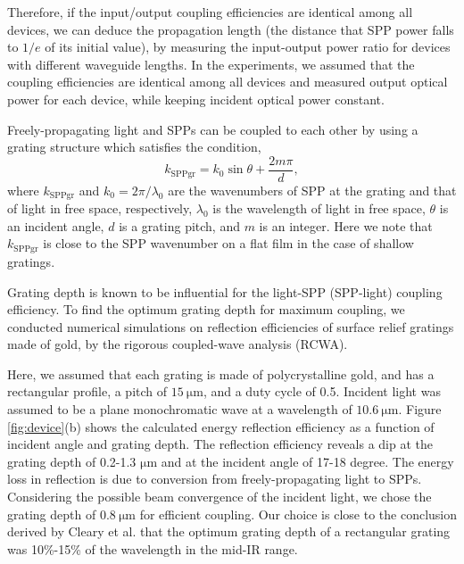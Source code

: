 \documentclass[aip,apl,reprint]{revtex4-1}
\begin{document}
Therefore, if the input/output coupling efficiencies are identical among all devices, we can deduce the propagation length (the distance that SPP power falls to $1/e$ of its initial value), by measuring the input-output power ratio for devices with different waveguide lengths.  In the experiments, we assumed that the coupling efficiencies are identical among all devices and measured output optical power for each device, while keeping incident optical power constant. 

Freely-propagating light and SPPs can be coupled to each other by using a grating structure which satisfies the condition\cite{Koev},
\begin{equation}
k_{\mathrm{SPPgr}}=k_0 \sin \theta + \frac{2m\pi}{d},
\label{eq:phase-match}
\end{equation}
where $k_{\mathrm{SPPgr}}$ and $k_0=2\pi/\lambda_0$ are the wavenumbers of SPP at the grating and that of light in free space, respectively, $\lambda_0$ is the wavelength of light in free space, $\theta$ is an incident angle, $d$ is a grating pitch, and $m$ is an integer. Here we note that $k_{\mathrm{SPPgr}}$ is close to the SPP wavenumber on a flat film in the case of shallow gratings.

Grating depth is known to be influential for the light-SPP (SPP-light) coupling efficiency\cite{Koev, Cleary2010}. To find the optimum grating \color{red}depth \color{black}for maximum coupling, we conducted numerical simulations on reflection efficiencies of surface relief gratings made of gold, by the rigorous coupled-wave analysis (RCWA)\cite{Leveque}. 

Here, we assumed that each grating is made of polycrystalline gold, and has a rectangular profile, a pitch of $15\:\mathrm{\mu m}$, and a duty cycle of 0.5. Incident light was assumed to be a plane monochromatic wave at a wavelength of $10.6\:\mathrm{\mu m}$. 
Figure \ref{fig:device}(b) shows the calculated \color{red}energy \color{black}reflection efficiency as a function of incident angle and grating depth. The reflection efficiency reveals a dip at the grating depth \color{red}of \color{black}0.2-1.3 $\mathrm{\mu m}$ and at the incident angle of 17-18 degree. The \color{red}energy \color{black}loss in reflection \color{red}is due to \color{black}conversion from freely-propagating light to SPPs.
Considering the possible beam convergence of the incident light, we chose the grating depth of $0.8\:\mathrm{\mu m}$ for efficient coupling. Our choice is close to the conclusion derived by Cleary et al.\cite{Cleary2010} that the optimum grating depth of a rectangular grating \color{red}was \color{black}10\%-15\% of the wavelength in the mid-IR range.
\end{document}
